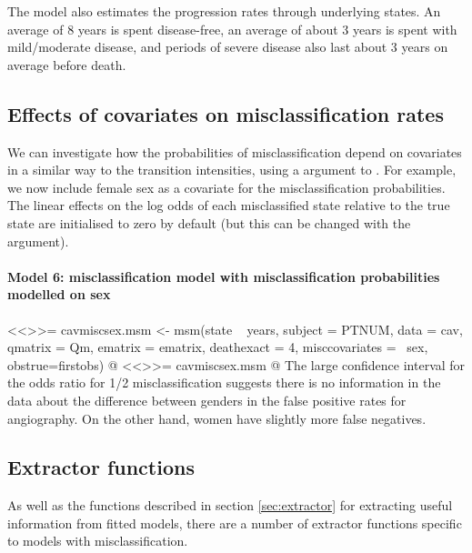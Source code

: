 The model also estimates the progression rates through underlying
states.  An average of 8 years is spent disease-free, an average of
about 3 years is spent with mild/moderate disease, and periods of severe
disease also last about 3 years on average before death.

\subsection{Effects of covariates on misclassification rates}

We can investigate how the probabilities of misclassification depend
on covariates in a similar way to the transition intensities, using a
 argument to . For example, we
now include female sex as a covariate for the misclassification
probabilities.  The linear effects on the log odds of each misclassified
state relative to the true state are initialised to zero by default (but
this can be changed with the  argument).


\paragraph{Model 6: misclassification model with misclassification probabilities modelled on sex}

<<>>=
cavmiscsex.msm <- msm(state ~ years, subject = PTNUM, data = cav,
                      qmatrix = Qm, ematrix = ematrix,
                      deathexact = 4, misccovariates = ~sex,
                      obstrue=firstobs)
@
<<>>=
cavmiscsex.msm
@
The large confidence interval for the odds ratio for 1/2 misclassification suggests
there is no information in the data about the difference between genders in 
the false positive rates for angiography. On the other hand, women have slightly more
false negatives.


\subsection{Extractor functions}

As well as the functions described in section \ref{sec:extractor} for
extracting useful information from fitted models, there are a number
of extractor functions specific to models with misclassification.

